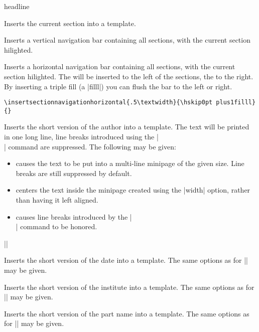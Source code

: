 \begin{element}{headline}
\begin{itemize}
    \iteminsert{\insertsection}
    Inserts the current section into a template.

    \iteminsert{\insertsectionnavigation}
    Inserts a vertical navigation bar containing all sections, with the
    current section hilighted.

    \iteminsert{\insertsectionnavigationhorizontal}
    Inserts a horizontal navigation bar containing all sections, with
    the current section hilighted. The  will be
    inserted to the left of the sections, the  to the
    right. By inserting a triple fill (a
    |filll|) you can flush the bar to the left or right.
    \example
\begin{verbatim}
\insertsectionnavigationhorizontal{.5\textwidth}{\hskip0pt plus1filll}{}
\end{verbatim}

    \iteminsert{\insertshortauthor}
    Inserts the short version of the author into a template. The text
    will be printed in one long line, line breaks introduced using the
    |\\| command are suppressed.  The
    following  may be given:
    \begin{itemize}
    \item
      causes the text to be put into a multi-line minipage of the given
      size. Line breaks are still suppressed by default.
    \item
      centers the text inside the minipage created using the |width|
      option, rather than having it left aligned.
    \item
      causes line breaks introduced by the |\\| command to be honored.
    \end{itemize}

    \example |\insertauthor[width={3cm},center,respectlinebreaks]|

    \iteminsert{\insertshortdate}
    Inserts the short version of the date into a template. The same
    options as for |\insertshortauthor| may be given.

    \iteminsert{\insertshortinstitute}
    Inserts the short version of the institute into a template. The same
    options as for |\insertshortauthor| may be given.

    \iteminsert{\insertshortpart}
    Inserts the short version of the part name into a template. The same
    options as for |\insertshortauthor| may be given.


\end{itemize}
\end{element}
